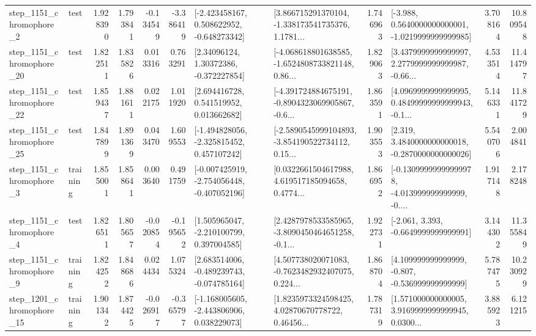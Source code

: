 \begin{tabular}{llrrrrllrlrr}
  step\_1151\_chromophore\_2 &      test &      1.928390 &    1.793841 &     -0.134549 & -3.386419 &   [-2.423458167, 0.508622952, -0.648273342] &  [3.866715291370104, -1.338173541735376, 1.1781... &       1.746963 &  [-3.988, 0.5640000000000001, -1.0219999999999985] &            3.708164 &         10.809548 \\
 step\_1151\_chromophore\_20 &      test &      1.822511 &    1.835826 &      0.013316 &  0.763291 &      [2.34096124, 1.30372386, -0.372227854] &  [-4.068618801638585, -1.6524808733821148, 0.86... &       1.829063 &  [3.4379999999999997, 2.2779999999999987, -0.66... &            4.533514 &         11.414797 \\
 step\_1151\_chromophore\_22 &      test &      1.859437 &    1.881611 &      0.022175 &  1.011920 &     [2.694416728, 0.541519952, 0.013662682] &  [-4.391724884675191, -0.8904323069905867, -0.6... &       1.863591 &  [4.0969999999999995, 0.48499999999999943, -0.1... &            5.146331 &         11.841729 \\
 step\_1151\_chromophore\_25 &      test &      1.847899 &    1.891369 &      0.043470 &  1.609553 &   [-1.494828056, -2.325815452, 0.457107242] &  [-2.5890545999104893, -3.854190522734112, 0.15... &       1.903553 &   [2.319, 3.4840000000000018, -0.2870000000000026] &            5.540706 &          2.004841 \\
  step\_1151\_chromophore\_3 &  training &      1.855001 &    1.858641 &      0.003640 &  0.491759 &  [-0.007425919, -2.754056448, -0.407052196] &  [0.0322661504617988, 4.619517185094658, 0.4774... &       1.866952 &  [-0.13099999999999978, -4.013999999999999, -0.... &            1.917148 &          2.178248 \\
  step\_1151\_chromophore\_4 &      test &      1.826511 &    1.805657 &     -0.020854 & -0.195652 &    [1.505965047, -2.210100799, 0.397004585] &  [2.4287978533585965, -3.8090450464651258, -0.1... &       1.922731 &               [-2.061, 3.393, -0.6649999999999991] &            3.144302 &         11.355849 \\
  step\_1151\_chromophore\_9 &  training &      1.824252 &    1.848686 &      0.024434 &  1.075324 &   [2.683514006, -0.489239743, -0.074785164] &  [4.507738020071083, -0.7623482932407075, 0.224... &       1.868704 &    [4.109999999999999, -0.807, -0.536999999999999] &            5.787475 &         10.230929 \\
 step\_1201\_chromophore\_15 &  training &      1.901342 &    1.874425 &     -0.026917 & -0.365797 &   [-1.168005605, -2.443806906, 0.038229073] &  [1.8235973324598425, 4.02870670778722, 0.46456... &       1.787319 &  [1.571000000000005, 3.9169999999999945, 0.0300... &            3.885923 &          6.121215 \\

\end{tabular}
